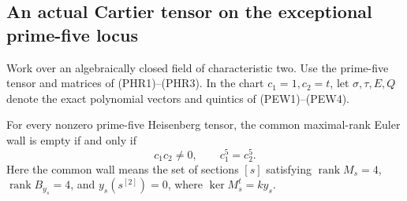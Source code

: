 \subsection{An actual Cartier tensor on the exceptional prime-five locus}

Work over an algebraically closed field of characteristic two.  Use
the prime-five tensor and matrices of (PHR1)--(PHR3).  In the chart
\(c_1=1,c_2=t\), let \(\sigma,\tau,E,Q\) denote the exact
polynomial vectors and quintics of (PEW1)--(PEW4).

\begin{lemma}
\label{lem:prime-five-common-wall-iff-ratio}
For every nonzero prime-five Heisenberg tensor, the common
maximal-rank Euler wall is empty if and only if
\[
             c_1c_2\ne0,\qquad c_1^5=c_2^5.       \tag{PAE1}
\]
Here the common wall means the set of sections \([s]\) satisfying
\(\operatorname{rank}M_s=4\),
\(\operatorname{rank}B_{y_s}=4\), and
\(y_s(s^{[2]})=0\), where \(\ker M_s^t=ky_s\).
\end{lemma}
